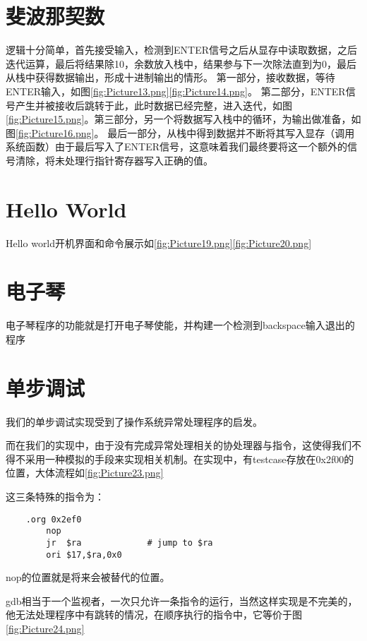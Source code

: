 \section{斐波那契数}
    逻辑十分简单，首先接受输入，检测到ENTER信号之后从显存中读取数据，之后迭代运算，最后将结果除10，余数放入栈中，结果参与下一次除法直到为0，最后从栈中获得数据输出，形成十进制输出的情形。
    第一部分，接收数据，等待ENTER输入，如图\ref{fig:Picture13.png}\ref{fig:Picture14.png}。
    第二部分，ENTER信号产生并被接收后跳转于此，此时数据已经完整，进入迭代，如图\ref{fig:Picture15.png}。第三部分，另一个将数据写入栈中的循环，为输出做准备，如图\ref{fig:Picture16.png}。
    最后一部分，从栈中得到数据并不断将其写入显存（调用系统函数）由于最后写入了ENTER信号，这意味着我们最终要将这一个额外的信号清除，将未处理行指针寄存器写入正确的值。
\section{Hello World}
    Hello world开机界面和命令展示如\ref{fig:Picture19.png}\ref{fig:Picture20.png}
\section{电子琴}
    电子琴程序的功能就是打开电子琴使能，并构建一个检测到backspace输入退出的程序
\section{单步调试}
    我们的单步调试实现受到了操作系统异常处理程序的启发。

    而在我们的实现中，由于没有完成异常处理相关的协处理器与指令，这使得我们不得不采用一种模拟的手段来实现相关机制。在实现中，有testcase存放在0x2f00的位置，大体流程如\ref{fig:Picture23.png}

    \clearpage
    这三条特殊的指令为：
    \begin{verbatim}
    .org 0x2ef0
        nop
        jr  $ra             # jump to $ra
        ori $17,$ra,0x0
    \end{verbatim}
    nop的位置就是将来会被替代的位置。\par
    gdb相当于一个监视者，一次只允许一条指令的运行，当然这样实现是不完美的，他无法处理程序中有跳转的情况，在顺序执行的指令中，它等价于图\ref{fig:Picture24.png}\par 
    
